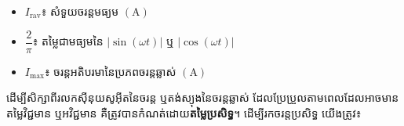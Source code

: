 \vspace{0.2em}
\noindent
\begin{minipage}[t]{0.48\textwidth}
	\begin{itemize}[itemsep=2pt, topsep=1pt, parsep=0pt, leftmargin=1.5em]
		\item $I_{\mathrm{rav}}$៖ សំទួយចរន្តមធ្យម $(\mathrm{A})$
		\item $\dfrac{2}{\pi}$៖ តម្លៃជាមធ្យមនៃ $|\sin(\omega t)|$ ឬ $|\cos(\omega t)|$
	\end{itemize}
\end{minipage}%
\hfill
\begin{minipage}[t]{0.48\textwidth}
	\begin{itemize}[itemsep=2pt, topsep=1pt, parsep=0pt, leftmargin=1.5em]
		\item $I_{\max}$៖ ចរន្តអតិបរមានៃប្រភពចរន្តឆ្លាស់ $(\mathrm{A})$
	\end{itemize}
\end{minipage}

\vspace{0.4em}


ដើម្បីសិក្សាពីរលកស៊ីនុយសូអុីតនៃចរន្ត ឬតង់ស្យុងនៃចរន្តឆ្លាស់ ដែលប្រែប្រួលតាមពេលដែលអាចមានតម្លៃវិជ្ជមាន ឬអវិជ្ជមាន គឺត្រូវបានកំណត់ដោយ\textbf{តម្លៃប្រសិទ្ធ}។ ដើម្បីរកចរន្តប្រសិទ្ធ យើងត្រូវ៖


